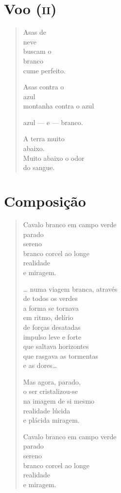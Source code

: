 \chapter{Voo (\textsc{ii})}

\begin{verse}
Asas de\\
neve\\
buscam o\\
branco\\
cume perfeito.

Asas contra o\\
azul\\
montanha contra o azul

azul --- e --- branco.

A terra muito\\
\hfill abaixo.\\
Muito abaixo o odor\\
\hfill do sangue.
\end{verse}

\chapter{Composição}

\begin{verse}
Cavalo branco em campo verde\\
parado\\
sereno\\
branco corcel ao longe\\
realidade\\
e miragem.

\ldots{} numa viagem branca, através\\
de todos os verdes\\
a forma se tornava\\
em ritmo, delírio\\
de forças desatadas\\
impulso leve e forte\\
que saltava horizontes\\
que rasgava as tormentas\\
\hfill e as dores\ldots{}

Mas agora, parado,\\
o ser cristalizou-se\\
na imagem de si mesmo\\
realidade lúcida\\
e plácida miragem.

\dotfill

Cavalo branco em campo verde\\
parado\\
sereno\\
branco corcel ao longe\\
realidade\\
e miragem.
\end{verse}

